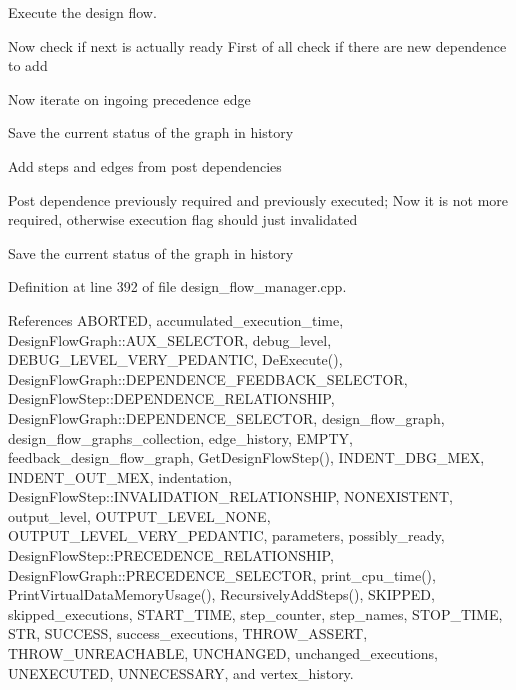Execute the design flow. 

Now check if next is actually ready First of all check if there are new dependence to add

Now iterate on ingoing precedence edge

Save the current status of the graph in history

Add steps and edges from post dependencies

Post dependence previously required and previously executed; Now it is not more required, otherwise execution flag should just invalidated

Save the current status of the graph in history 

Definition at line 392 of file design\+\_\+flow\+\_\+manager.\+cpp.



References A\+B\+O\+R\+T\+ED, accumulated\+\_\+execution\+\_\+time, Design\+Flow\+Graph\+::\+A\+U\+X\+\_\+\+S\+E\+L\+E\+C\+T\+OR, debug\+\_\+level, D\+E\+B\+U\+G\+\_\+\+L\+E\+V\+E\+L\+\_\+\+V\+E\+R\+Y\+\_\+\+P\+E\+D\+A\+N\+T\+IC, De\+Execute(), Design\+Flow\+Graph\+::\+D\+E\+P\+E\+N\+D\+E\+N\+C\+E\+\_\+\+F\+E\+E\+D\+B\+A\+C\+K\+\_\+\+S\+E\+L\+E\+C\+T\+OR, Design\+Flow\+Step\+::\+D\+E\+P\+E\+N\+D\+E\+N\+C\+E\+\_\+\+R\+E\+L\+A\+T\+I\+O\+N\+S\+H\+IP, Design\+Flow\+Graph\+::\+D\+E\+P\+E\+N\+D\+E\+N\+C\+E\+\_\+\+S\+E\+L\+E\+C\+T\+OR, design\+\_\+flow\+\_\+graph, design\+\_\+flow\+\_\+graphs\+\_\+collection, edge\+\_\+history, E\+M\+P\+TY, feedback\+\_\+design\+\_\+flow\+\_\+graph, Get\+Design\+Flow\+Step(), I\+N\+D\+E\+N\+T\+\_\+\+D\+B\+G\+\_\+\+M\+EX, I\+N\+D\+E\+N\+T\+\_\+\+O\+U\+T\+\_\+\+M\+EX, indentation, Design\+Flow\+Step\+::\+I\+N\+V\+A\+L\+I\+D\+A\+T\+I\+O\+N\+\_\+\+R\+E\+L\+A\+T\+I\+O\+N\+S\+H\+IP, N\+O\+N\+E\+X\+I\+S\+T\+E\+NT, output\+\_\+level, O\+U\+T\+P\+U\+T\+\_\+\+L\+E\+V\+E\+L\+\_\+\+N\+O\+NE, O\+U\+T\+P\+U\+T\+\_\+\+L\+E\+V\+E\+L\+\_\+\+V\+E\+R\+Y\+\_\+\+P\+E\+D\+A\+N\+T\+IC, parameters, possibly\+\_\+ready, Design\+Flow\+Step\+::\+P\+R\+E\+C\+E\+D\+E\+N\+C\+E\+\_\+\+R\+E\+L\+A\+T\+I\+O\+N\+S\+H\+IP, Design\+Flow\+Graph\+::\+P\+R\+E\+C\+E\+D\+E\+N\+C\+E\+\_\+\+S\+E\+L\+E\+C\+T\+OR, print\+\_\+cpu\+\_\+time(), Print\+Virtual\+Data\+Memory\+Usage(), Recursively\+Add\+Steps(), S\+K\+I\+P\+P\+ED, skipped\+\_\+executions, S\+T\+A\+R\+T\+\_\+\+T\+I\+ME, step\+\_\+counter, step\+\_\+names, S\+T\+O\+P\+\_\+\+T\+I\+ME, S\+TR, S\+U\+C\+C\+E\+SS, success\+\_\+executions, T\+H\+R\+O\+W\+\_\+\+A\+S\+S\+E\+RT, T\+H\+R\+O\+W\+\_\+\+U\+N\+R\+E\+A\+C\+H\+A\+B\+LE, U\+N\+C\+H\+A\+N\+G\+ED, unchanged\+\_\+executions, U\+N\+E\+X\+E\+C\+U\+T\+ED, U\+N\+N\+E\+C\+E\+S\+S\+A\+RY, and vertex\+\_\+history.

